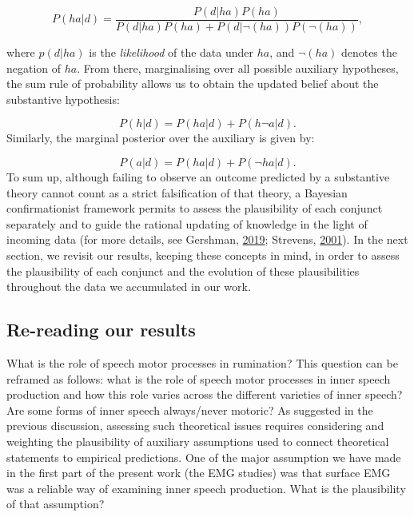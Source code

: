 \documentclass[a4paper,12pt,twoside,openright,oldfontcommands,final]{memoir}
\begin{document}
\[
P(h a | d) = \frac{P(d | h a) P(h a)}{P(d | h a) P(h a)+P(d | \neg(h a)) P(\neg(h a))},
\]

where \(p(d|ha)\) is the \emph{likelihood} of the data under \(ha\), and \(\lnot (ha)\) denotes the negation of \(ha\). From there, marginalising over all possible auxiliary hypotheses, the sum rule of probability allows us to obtain the updated belief about the substantive hypothesis:

\[P(h | d) = P(h a | d) + P(h \neg a | d).\]
Similarly, the marginal posterior over the auxiliary is given by:

\[P(a | d) = P(h a | d) + P(\neg h a | d).\]
To sum up, although failing to observe an outcome predicted by a substantive theory cannot count as a strict falsification of that theory, a Bayesian confirmationist framework permits to assess the plausibility of each conjunct separately and to guide the rational updating of knowledge in the light of incoming data (for more details, see Gershman, \protect\hyperlink{ref-gershman_how_2019}{2019}; Strevens, \protect\hyperlink{ref-strevens_bayesian_2001}{2001}). In the next section, we revisit our results, keeping these concepts in mind, in order to assess the plausibility of each conjunct and the evolution of these plausibilities throughout the data we accumulated in our work.

\hypertarget{re-reading-our-results}{%
\subsection{Re-reading our results}\label{re-reading-our-results}}

What is the role of speech motor processes in rumination? This question can be reframed as follows: what is the role of speech motor processes in inner speech production and how this role varies across the different varieties of inner speech? Are some forms of inner speech always/never motoric? As suggested in the previous discussion, assessing such theoretical issues requires considering and weighting the plausibility of auxiliary assumptions used to connect theoretical statements to empirical predictions. One of the major assumption we have made in the first part of the present work (the EMG studies) was that surface EMG was a reliable way of examining inner speech production. What is the plausibility of that assumption?
\end{document}
